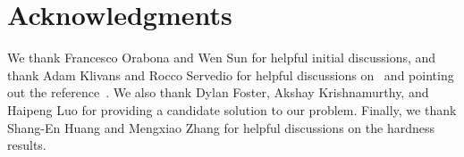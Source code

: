 \documentclass{article}
\begin{document}








\section*{Acknowledgments} We thank Francesco Orabona and Wen Sun
for helpful initial discussions, and thank Adam Klivans and Rocco \mbox{Servedio} for helpful
discussions on~\citep{Klivans-Servedio-2008} and
pointing out the reference~\citep{Klivans-Servedio-2004}. We also thank Dylan Foster, 
Akshay \mbox{Krishnamurthy}, and Haipeng Luo for providing a candidate solution to our problem. 
Finally, we thank Shang-En Huang and \mbox{Mengxiao} Zhang for helpful discussions on the hardness results. 


%




\onecolumn
\appendix
\clearpage












\end{document}
